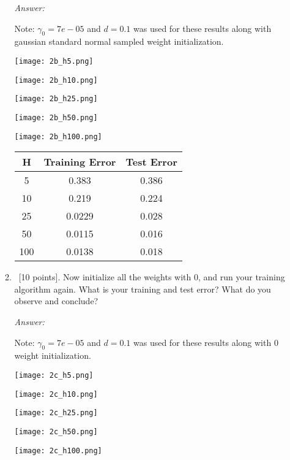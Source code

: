 \documentclass[12pt, fullpage,letterpaper]{article}
\begin{document}
\begin{enumerate}
\begin{enumerate}
	\textit{Answer:}

	Note: $\gamma_0 = 7e-05$ and $d = 0.1$ was used for these results along with gaussian standard normal sampled weight initialization.

	\begin{center}
		\texttt{[image: 2b\_h5.png]}
	\end{center}
	\begin{center}
		\texttt{[image: 2b\_h10.png]}
	\end{center}
	\begin{center}
		\texttt{[image: 2b\_h25.png]}
	\end{center}
	\begin{center}
		\texttt{[image: 2b\_h50.png]}
	\end{center}
	\begin{center}
		\texttt{[image: 2b\_h100.png]}
	\end{center}
	\begin{center}

	\begin{tabular}{|c|c|c|}
		\hline
		H & Training Error & Test Error \\ 
		\hline
		5 & 0.383 & 0.386 \\
		\hline
		10 & 0.219 & 0.224 \\
		\hline
		25 & 0.0229 & 0.028 \\
		\hline
		50 & 0.0115 & 0.016 \\
		\hline
		100 & 0.0138 & 0.018 \\
		\hline
	\end{tabular}
	\end{center}
	
	
	

	
	\item~[10 points]. Now initialize all the weights with $0$, and run your training algorithm again. What is your training and test error? What do you observe and  conclude?

	\textit{Answer:}

	Note: $\gamma_0 = 7e-05$ and $d = 0.1$ was used for these results along with $0$ weight initialization.

	\begin{center}
		\texttt{[image: 2c\_h5.png]}
	\end{center}
	\begin{center}
		\texttt{[image: 2c\_h10.png]}
	\end{center}
	\begin{center}
		\texttt{[image: 2c\_h25.png]}
	\end{center}
	\begin{center}
		\texttt{[image: 2c\_h50.png]}
	\end{center}
	\begin{center}
		\texttt{[image: 2c\_h100.png]}
	\end{center}


\end{enumerate}
\end{enumerate}
\end{document}
